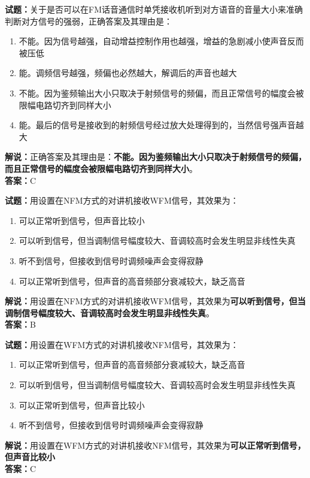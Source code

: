 \documentclass{ctexbook}
\begin{document}
\bigskip


\noindent\textbf{试题：}关于是否可以在FM话音通信时单凭接收机听到对方语音的音量大小来准确判断对方信号的强弱，正确答案及其理由是：
\begin{enumerate}[leftmargin=3em]
\item 不能。因为信号越强，自动增益控制作用也越强，增益的急剧减小使声音反而被压低
\item 能。调频信号越强，频偏也必然越大，解调后的声音也越大
\item 不能。因为鉴频输出大小只取决于射频信号的频偏，而且正常信号的幅度会被限幅电路切齐到同样大小
\item 能。最后的信号是接收到的射频信号经过放大处理得到的，当然信号强声音越大
\end{enumerate}
\noindent\textbf{解说：}正确答案及其理由是：\textbf{不能。因为鉴频输出大小只取决于射频信号的频偏，而且正常信号的幅度会被限幅电路切齐到同样大小}。\\\noindent\textbf{答案：}C


\bigskip


\noindent\textbf{试题：}用设置在NFM方式的对讲机接收WFM信号，其效果为：
\begin{enumerate}[leftmargin=3em]
\item 可以正常听到信号，但声音比较小
\item 可以听到信号，但当调制信号幅度较大、音调较高时会发生明显非线性失真
\item 听不到信号，但接收到信号时调频噪声会变得寂静
\item 可以正常听到信号，但声音的高音频部分衰减较大，缺乏高音
\end{enumerate}
\noindent\textbf{解说：}用设置在NFM方式的对讲机接收WFM信号，其效果为\textbf{可以听到信号，但当调制信号幅度较大、音调较高时会发生明显非线性失真}。\\\noindent\textbf{答案：}B



\bigskip


\noindent\textbf{试题：}用设置在WFM方式的对讲机接收NFM信号，其效果为：
\begin{enumerate}[leftmargin=3em]
\item 可以正常听到信号，但声音的高音频部分衰减较大，缺乏高音
\item 可以听到信号，但当调制信号幅度较大、音调较高时会发生明显非线性失真
\item 可以正常听到信号，但声音比较小
\item 听不到信号，但接收到信号时调频噪声会变得寂静
\end{enumerate}
\noindent\textbf{解说：}用设置在WFM方式的对讲机接收NFM信号，其效果为\textbf{可以正常听到信号，但声音比较小}\\\noindent\textbf{答案：}C
\end{document}
